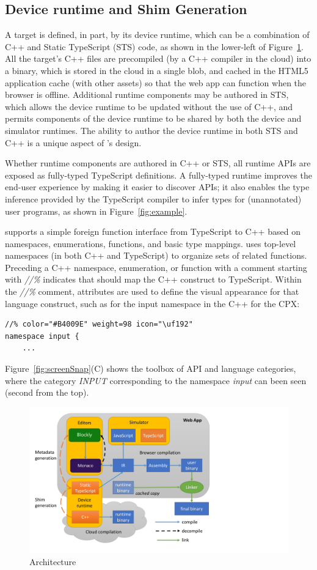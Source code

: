 \subsection{Device runtime and Shim Generation}

A \MC target is defined, in part, by its device runtime, which can be a combination of C++ 
and Static TypeScript (STS) code, as shown in the lower-left of Figure~\ref{fig:makecode}.
All the target's C++ files are precompiled (by a C++ compiler in the cloud)
into a binary, which is stored in the cloud in a single blob, and cached in the HTML5 application cache (with 
other assets) so that the web app can function when the browser is offline. Additional runtime
components may be authored in STS, which allows the device runtime to be updated without the
use of C++, and permits components of the device runtime to be shared by both the device
and simulator runtimes. The ability to author the device runtime in both STS and C++ is
a unique aspect of \MCN's design.

Whether runtime components are authored in C++ or STS, all runtime APIs are exposed as fully-typed
TypeScript definitions. A fully-typed runtime improves the end-user experience 
by making it easier to discover APIs; it also enables the type inference provided by the TypeScript 
compiler to infer types for (unannotated) user programs, as shown in Figure~\ref{fig:example}.

\MC supports a simple foreign function interface from TypeScript to C++ based on namespaces,
enumerations, functions, and basic type mappings. \MC uses top-level namespaces (in both C++ and
TypeScript) to organize sets of related functions.  Preceding a C++ namespace, enumeration, or function
with a comment starting with \emph{//\%} indicates that \MC should map the C++ construct to TypeScript.
Within the \emph{//\%} comment, attributes are used to define the visual appearance for that
language construct, such as for the input namespace in the C++ for the CPX:
\begin{lstlisting}
//% color="#B4009E" weight=98 icon="\uf192"
namespace input {
    ...
\end{lstlisting}

Figure~\ref{fig:screenSnap}(C) shows the toolbox of API and language categories, where the 
category \emph{INPUT} corresponding to the namespace \emph{input} can been seen (second
from the top).

\begin{figure}[t]
    \includegraphics[width=4.5in]{makecodeFig.pdf}
\caption{\label{fig:makecode}\MC Architecture}
\end{figure}

